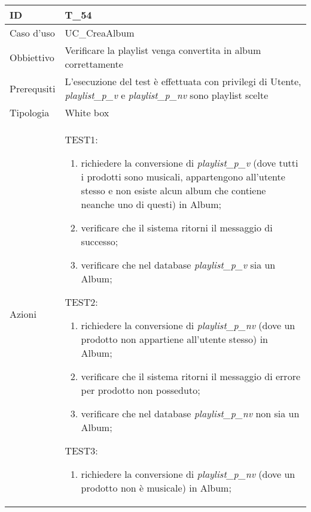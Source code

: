 \begin{table}[hb]
    \centering
    \begin{tabular}{ |p{2cm}|p{10cm}|  }
        \hline
        ID          & T\_54                                                                              \\\hline
        Caso d'uso  & UC\_CreaAlbum                                                             \\\hline
        Obbiettivo  & Verificare la playlist venga convertita in album correttamente               \\\hline
        Prerequsiti & L'esecuzione del test è effettuata con privilegi di Utente, \emph{playlist\_p\_v} e \emph{playlist\_p\_nv}
        sono playlist scelte                                                                            \\\hline
        Tipologia   & White box                                                                          \\\hline
        Azioni      &
        TEST1:
        \begin{enumerate}[nosep, topsep=0pt]
            \item richiedere la conversione di \emph{playlist\_p\_v} (dove tutti i prodotti sono musicali, appartengono
            all'utente stesso e non esiste alcun album che contiene neanche uno di questi) in Album;
            \item verificare che il sistema ritorni il messaggio di successo;
            \item verificare che nel database \emph{playlist\_p\_v} sia un Album;
        \end{enumerate}
        \vspace{0.5cm} TEST2:
        \begin{enumerate}[nosep, topsep=0pt]
            \item richiedere la conversione di \emph{playlist\_p\_nv} (dove un prodotto non appartiene all'utente stesso) in Album;
            \item verificare che il sistema ritorni il messaggio di errore per prodotto non posseduto;
            \item verificare che nel database \emph{playlist\_p\_nv} non sia un Album;
        \end{enumerate}
        \vspace{0.5cm} TEST3:
        \begin{enumerate}[nosep, topsep=0pt]
            \item richiedere la conversione di \emph{playlist\_p\_nv} (dove un prodotto non è musicale) in Album;

\end{enumerate}
\end{tabular}
\end{table}
